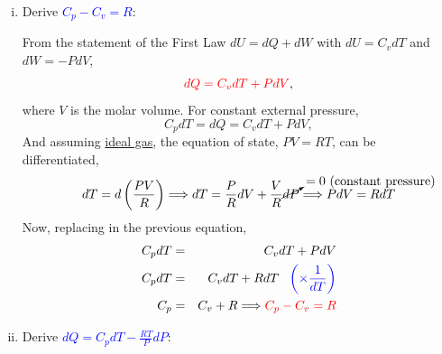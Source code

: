 \documentclass[12pts,a4paper,amsmath,amssymb,floatfix]{article}%
\newcommand{\frc}{\displaystyle\frac}
\newcommand{\red}{\textcolor{red}}
\newcommand{\blue}{\textcolor{blue}}
\begin{document}
   \begin{enumerate}[i)]
%
      \item Derive \blue{$C_{p}-C_{v}=R$}:

           From the statement of the First Law $dU = dQ + dW$ with $dU=C_{v}dT$ and $dW = -PdV$,
              \begin{equation}
                  \red{dQ = C_{v}dT + PdV},\label{Mod01_1Law_1}
              \end{equation}
           where $V$ is the molar volume. For constant external pressure,
              \begin{displaymath}
                  C_{p}dT = dQ = C_{v}dT + PdV,
              \end{displaymath}
           And assuming \underline{ideal gas}, the equation of state, $PV=RT$, can be differentiated,
              \begin{displaymath}
                  dT = d\left(\frc{P V}{R}\right) \Longrightarrow dT =\frc{P}{R}dV + \frc{V}{R}\cancelto{=0\text{ (constant pressure)}}{dP}  \Longrightarrow PdV = RdT
              \end{displaymath}
           Now, replacing in the previous equation,
              \begin{eqnarray}
                  C_{p}dT &=& C_{v}dT + PdV \nonumber \\
                  C_{p}dT &=& C_{v}dT + RdT \;\;\;\blue{\left(\times \frc{1}{dT}\right)} \nonumber\\
                  C_{p} &=& C_{v} + R \Longrightarrow \red{C_{p}-C_{v}=R}  \label{Mod01_1Law_CpCv}
              \end{eqnarray}
%
      \item Derive \blue{$dQ=C_{p}dT-\frc{RT}{P}dP$}: 


\end{enumerate}
\end{document}
